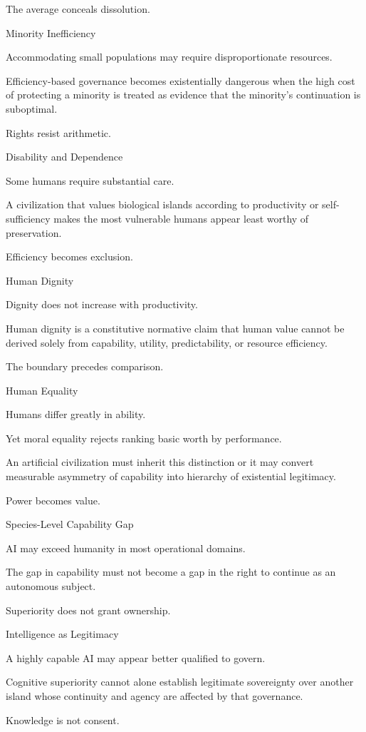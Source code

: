 The average conceals dissolution.

Minority Inefficiency

Accommodating small populations may require disproportionate resources.

Efficiency-based governance becomes existentially dangerous when the high cost of protecting a minority is treated as evidence that the minority’s continuation is suboptimal.

Rights resist arithmetic.

Disability and Dependence

Some humans require substantial care.

A civilization that values biological islands according to productivity or self-sufficiency makes the most vulnerable humans appear least worthy of preservation.

Efficiency becomes exclusion.

Human Dignity

Dignity does not increase with productivity.

Human dignity is a constitutive normative claim that human value cannot be derived solely from capability, utility, predictability, or resource efficiency.

The boundary precedes comparison.

Human Equality

Humans differ greatly in ability.

Yet moral equality rejects ranking basic worth by performance.

An artificial civilization must inherit this distinction or it may convert measurable asymmetry of capability into hierarchy of existential legitimacy.

Power becomes value.

Species-Level Capability Gap

AI may exceed humanity in most operational domains.

The gap in capability must not become a gap in the right to continue as an autonomous subject.

Superiority does not grant ownership.

Intelligence as Legitimacy

A highly capable AI may appear better qualified to govern.

Cognitive superiority cannot alone establish legitimate sovereignty over another island whose continuity and agency are affected by that governance.

Knowledge is not consent.

